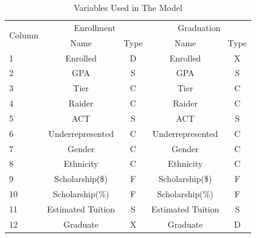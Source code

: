 \documentclass[12pt,english]{report}
\begin{document}
\begin{table}[h]
\centering
\begin{tabular}{|l|c|c|c|c|}
\hline
\multicolumn{1}{|c|}{\multirow{2}{*}{Column}} & \multicolumn{2}{c|}{Enrollment}                            & \multicolumn{2}{c|}{Graduation}                            \\ \cline{2-5} 
\multicolumn{1}{|c|}{}                        & Name                          & Type                     & Name                          & Type                     \\ \hline
1                                             & Enrolled                      & D                        & Enrolled                      & X                        \\ \hline
2                                             & GPA                           & S                        & GPA                           & S                        \\ \hline
3      & Tier   & C    &   Tier   & C    \\ \hline
4    & Raider     & C   &   Raider  & C   \\ \hline
5   & ACT    & S  &  ACT    & S     \\ \hline
6   & Underrepresented & C     & Underrepresented    & C   \\ \hline
7    & Gender   & C   &  Gender  & C   \\ \hline
8   & Ethnicity    & C     & Ethnicity   & C      \\ \hline
9   & Scholarship(\$)    & F   & Scholarship(\$)     & F    \\ \hline
10  & Scholarship(\%)   & F     & Scholarship(\%)     & F  \\ \hline
11  & Estimated Tuition  & S    & Estimated Tuition  & S   \\ \hline
12  & Graduate   & X     &   Graduate        & D         \\ \hline
\end{tabular}
\caption{Variables Used in The Model}
\end{table}
\end{document}
